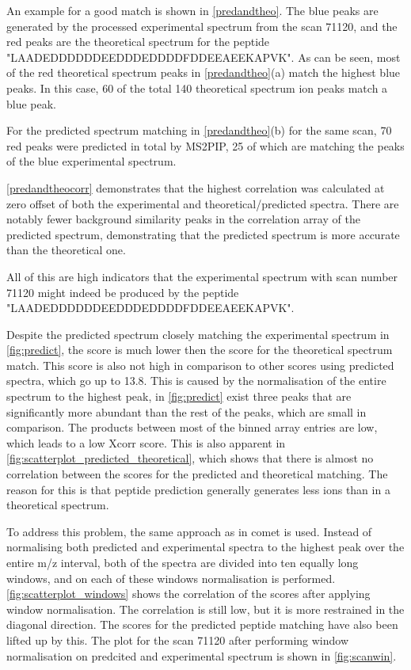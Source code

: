 \documentclass[11pt]{article}
\begin{document}
An example for a good match is shown in \cref{predandtheo}. The blue peaks are generated by the processed experimental spectrum from the scan 71120, and the red peaks are the theoretical spectrum for the peptide "LAADEDDDDDDEEDDDEDDDDFDDEEAEEKAPVK". As can be seen, most of the red theoretical spectrum peaks in \cref{predandtheo}(a) match the highest blue peaks. In this case, 60 of the total 140 theoretical spectrum ion peaks match a blue peak. 

For the predicted spectrum matching in \cref{predandtheo}(b) for the same scan, 70 red peaks were predicted in total by MS2PIP, 25 of which are matching the peaks of the blue experimental spectrum.

\cref{predandtheocorr} demonstrates that the highest correlation was calculated at zero offset of both the experimental and theoretical/predicted spectra. There are notably fewer background similarity peaks in the correlation array of the predicted spectrum, demonstrating that the predicted spectrum is more accurate than the theoretical one.

All of this are high indicators that the experimental spectrum with scan number 71120 might indeed be produced by the peptide "LAADEDDDDDDEEDDDEDDDDFDDEEAEEKAPVK".

Despite the predicted spectrum closely matching the experimental spectrum in \cref{fig:predict}, the score is much lower then the score for the theoretical spectrum match. This score is also not high in comparison to other scores using predicted spectra, which go up to 13.8. This is caused by the normalisation of the entire spectrum to the highest peak, in \cref{fig:predict} exist three peaks that are significantly more abundant than the rest of the peaks, which are small in comparison. The products between most of the binned array entries are low, which leads to a low Xcorr score. This is also apparent in \cref{fig:scatterplot_predicted_theoretical}, which shows that there is almost no correlation between the scores for the predicted and theoretical matching. The reason for this is that peptide prediction generally generates less ions than in a theoretical spectrum.

To address this problem, the same approach as in comet is used. Instead of normalising both predicted and experimental spectra to the highest peak over the entire m/z interval, both of the spectra are divided into ten equally long windows, and on each of these windows normalisation is performed. \cref{fig:scatterplot_windows} shows the correlation of the scores after applying window normalisation. The correlation is still low, but it is more restrained in the diagonal direction. The scores for the predicted peptide matching have also been lifted up by this. The plot for the scan 71120 after performing window normalisation on predcited and experimental spectrum is shown in \cref{fig:scanwin}.
\end{document}
